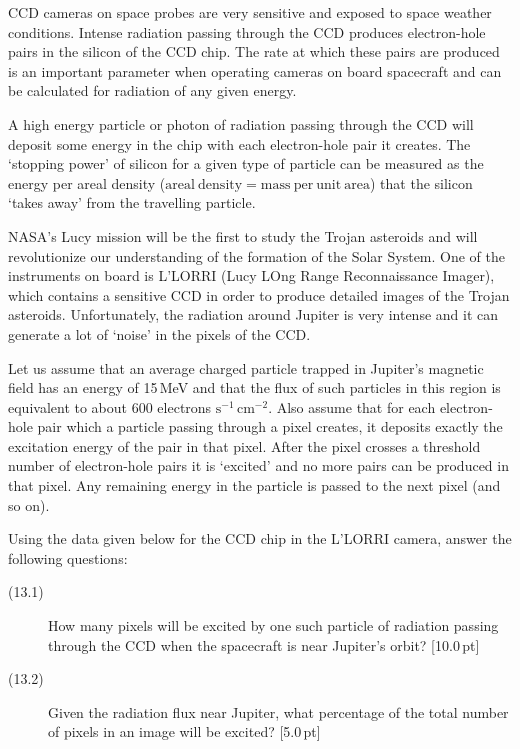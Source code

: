 CCD cameras on space probes are very sensitive and exposed to space weather
conditions. Intense radiation passing through the CCD produces electron-hole
pairs in the silicon of the CCD chip. The rate at which these pairs are
produced is an important parameter when operating cameras on board spacecraft
and can be calculated for radiation of any given energy.

A high energy particle or photon of radiation passing through the CCD will
deposit some energy in the chip with each electron-hole pair it creates. The
`stopping power' of silicon for a given type of particle can be measured as
the energy per areal density ($\mathrm{areal\ density} = \mathrm{mass\ per\
unit\ area}$) that the silicon `takes away' from the travelling particle.


NASA's Lucy mission will be the first to study the Trojan asteroids and will
revolutionize our understanding of the formation of the Solar System. One of
the instruments on board is L'LORRI (Lucy LOng Range Reconnaissance Imager),
which contains a sensitive CCD in order to produce detailed images of the
Trojan asteroids. Unfortunately, the radiation around Jupiter is very intense
and it can generate a lot of `noise' in the pixels of the CCD.

Let us assume that an average charged particle trapped in Jupiter's magnetic
field has an energy of 15\,MeV and that the flux of such particles in this
region is equivalent to about 600 electrons $\mathrm{s}^{-1}\,
\mathrm{cm}^{-2}$. Also assume that for each electron-hole pair which a
particle passing through a pixel creates, it deposits exactly the excitation
energy of the pair in that pixel. After the pixel crosses a threshold number
of electron-hole pairs it is `excited' and no more pairs can be produced in
that pixel. Any remaining energy in the particle is passed to the next pixel
(and so on).

Using the data given below for the CCD chip in the L'LORRI camera, answer the
following questions:

\begin{description}
\item[(13.1)] How many pixels will be excited by one such particle of
  radiation passing through the CCD when the spacecraft is near Jupiter's
  orbit? \hfill[10.0\,pt]
\item[(13.2)] Given the radiation flux near Jupiter, what percentage of the
  total number of pixels in an image will be excited? \hfill[5.0\,pt]
\end{description}

